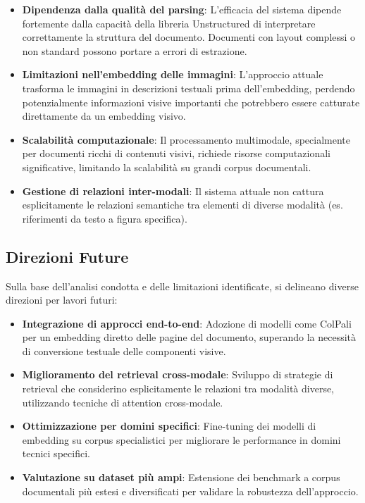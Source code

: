 \begin{itemize}
    \item \textbf{Dipendenza dalla qualità del parsing}: L'efficacia del sistema dipende fortemente dalla capacità della libreria Unstructured di interpretare correttamente la struttura del documento. Documenti con layout complessi o non standard possono portare a errori di estrazione.
    
    \item \textbf{Limitazioni nell'embedding delle immagini}: L'approccio attuale trasforma le immagini in descrizioni testuali prima dell'embedding, perdendo potenzialmente informazioni visive importanti che potrebbero essere catturate direttamente da un embedding visivo.
    
    \item \textbf{Scalabilità computazionale}: Il processamento multimodale, specialmente per documenti ricchi di contenuti visivi, richiede risorse computazionali significative, limitando la scalabilità su grandi corpus documentali.
    
    \item \textbf{Gestione di relazioni inter-modali}: Il sistema attuale non cattura esplicitamente le relazioni semantiche tra elementi di diverse modalità (es. riferimenti da testo a figura specifica).
\end{itemize}

\subsection{Direzioni Future}
Sulla base dell'analisi condotta e delle limitazioni identificate, si delineano diverse direzioni per lavori futuri:

\begin{itemize}
    \item \textbf{Integrazione di approcci end-to-end}: Adozione di modelli come ColPali per un embedding diretto delle pagine del documento, superando la necessità di conversione testuale delle componenti visive.
    
    \item \textbf{Miglioramento del retrieval cross-modale}: Sviluppo di strategie di retrieval che considerino esplicitamente le relazioni tra modalità diverse, utilizzando tecniche di attention cross-modale.
    
    \item \textbf{Ottimizzazione per domini specifici}: Fine-tuning dei modelli di embedding su corpus specialistici per migliorare le performance in domini tecnici specifici.
    
    \item \textbf{Valutazione su dataset più ampi}: Estensione dei benchmark a corpus documentali più estesi e diversificati per validare la robustezza dell'approccio.
\end{itemize}

